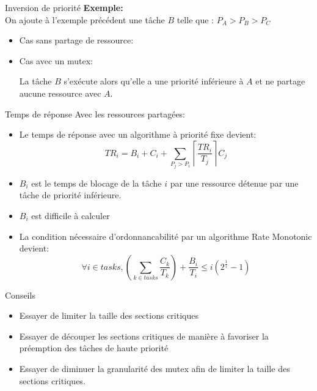 \begin{frame}{Inversion de priorité}
  \textbf{Exemple:}\\
  On ajoute à l'exemple précédent une  tâche $B$ telle que :
  $P_A > P_B > P_C$
  \begin{itemize}
  \item   Cas sans partage de ressource:
    \begin{center}
      
    \end{center}
  \item   Cas avec un mutex:
    \begin{center}
      
    \end{center}
    La tâche $B$  s'exécute alors qu'elle a une  priorité inférieure à
    $A$ et ne partage aucune ressource avec $A$.
  \end{itemize}
\end{frame}

\begin{frame}{Temps de réponse}
  Avec  les  ressources  partagées:
  \begin{itemize}
  \item  Le  temps de  réponse  avec  un  algorithme à  priorité  fixe
    devient:
    $$TR_i = B_i + C_i + \sum_{P_j > P_i} \left\lceil\frac{TR_i}{T_j}\right\rceil C_j$$
  \item  $B_i$  est le  temps  de  blocage de  la  tâche  $i$ par  une
    ressource
    détenue par une tâche de priorité inférieure.
  \item $B_i$ est difficile à calculer
  \item La  condition nécessaire d'ordonnancabilité  par un algorithme
    Rate Monotonic devient:
    $$\forall i \in tasks, \left( \sum_{k \in tasks} \frac{C_k}{T_k} \right) + \frac{B_i}{T_i} ≤ i \left(2^{\frac{1}{i}}-1\right)$$
  \end{itemize}
\end{frame}

\begin{frame}{Conseils}
  \begin{itemize}
  \item Essayer de limiter la taille des sections critiques
  \item  Essayer  de découper  les  sections  critiques  de manière  à
    favoriser la préemption des tâches de haute priorité
  \item Essayer de  diminuer la granularité des mutex  afin de limiter
    la taille des sections critiques.
  \end{itemize}
\end{frame}

